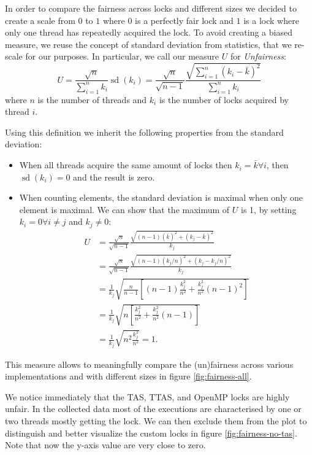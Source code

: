 In order to compare the fairness across locks and different sizes we decided to
create a scale from $0$ to $1$ where $0$ is a perfectly fair lock and $1$ is a
lock where only one thread has repeatedly acquired the lock.
To avoid creating a biased measure, we reuse the concept of standard deviation
from statistics, that we re-scale for our purposes.
In particular, we call our measure $U$ for \textit{Unfairness}:
$$
  U = \frac{\sqrt{n}}{\sum_{i = 1}^{n} k_i} \operatorname{sd}(k_i)
    = \frac{\sqrt{n}}{\sqrt{n-1}} \frac{\sqrt{\sum_{i = 1}^{n} (k_i - \bar{k})^2}}{\sum_{i = 1}^{n} k_i}
$$
where $n$ is the number of threads and $k_i$ is the number of locks acquired by thread $i$.

Using this definition we inherit the following properties from the standard deviation:
\begin{itemize}
  \item When all threads acquire the same amount of locks then
    $k_i = \bar{k} \forall i$, then $\operatorname{sd}(k_i) = 0 $ and the result
    is zero.
  \item When counting elements, the standard deviation is maximal when only one
    element is maximal.
    We can show that the maximum of $U$ is 1, by setting $k_i = 0 \forall i \neq j$ and $k_j \neq 0$:
    \begin{align*}
      U &= \frac{\sqrt{n}}{\sqrt{n-1}} \frac{\sqrt{(n-1)(\bar{k})^2 + (k_j - \bar{k})^2}}{k_j} \\
        &= \frac{\sqrt{n}}{\sqrt{n-1}} \frac{\sqrt{(n-1)(k_j/n)^2 + (k_j - k_j/n)^2}}{k_j} \\
        &= \frac{1}{k_j} \sqrt{\frac{n}{n-1} \left[(n-1)\frac{k_j^2}{n^2} + \frac{k_j^2}{n^2}(n - 1)^2 \right]} \\
        &= \frac{1}{k_j} \sqrt{n \left[\frac{k_j^2}{n^2} + \frac{k_j^2}{n^2}(n - 1) \right]} \\
        &= \frac{1}{k_j} \sqrt{n^2\frac{k_j^2}{n^2}} = 1.
    \end{align*}
\end{itemize}

This measure allows to meaningfully compare the (un)fairness across
various implementations and with different sizes in figure \ref{fig:fairness-all}.

We notice immediately that the TAS, TTAS, and OpenMP locks are highly unfair.
In the collected data most of the executions are characterised by one or two
threads mostly getting the lock.
We can then exclude them from the plot to distinguish and better visualize the custom locks in figure \ref{fig:fairness-no-tas}. Note that now the y-axis value are very close to zero.

